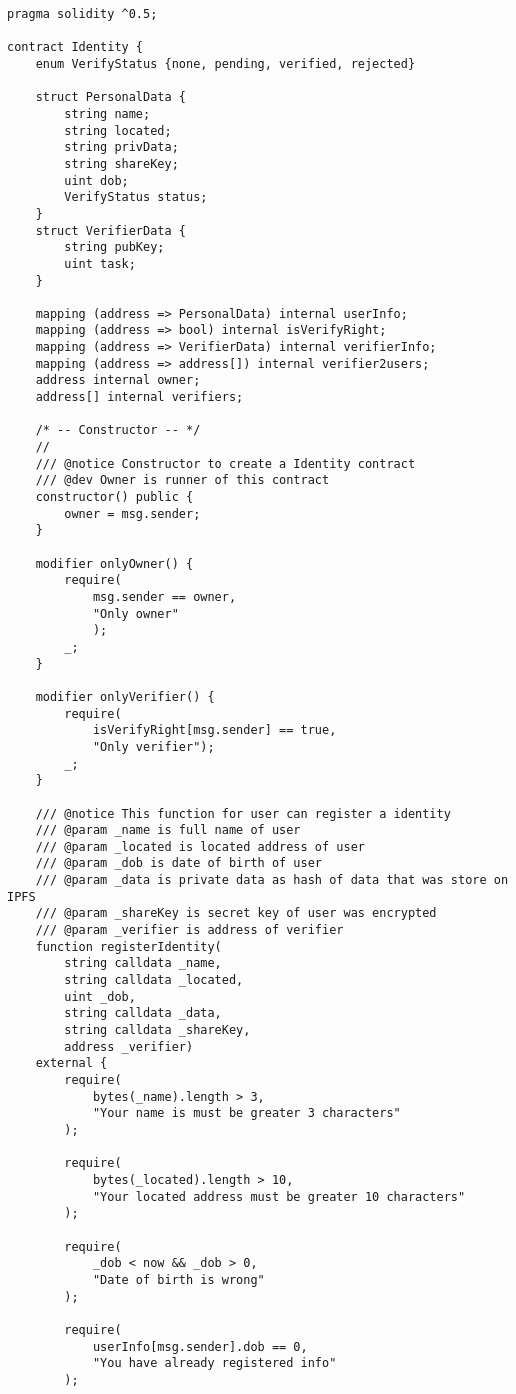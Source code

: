 \documentclass[../main-report.tex]{subfiles}
\begin{document}
\begin{lstlisting}
pragma solidity ^0.5;

contract Identity {
    enum VerifyStatus {none, pending, verified, rejected}

    struct PersonalData {
        string name;
        string located;
        string privData;
        string shareKey;
        uint dob;
        VerifyStatus status;
    }
    struct VerifierData {
        string pubKey;
        uint task;
    }

    mapping (address => PersonalData) internal userInfo;
    mapping (address => bool) internal isVerifyRight;
    mapping (address => VerifierData) internal verifierInfo;
    mapping (address => address[]) internal verifier2users;
    address internal owner;
    address[] internal verifiers;

    /* -- Constructor -- */
    //
    /// @notice Constructor to create a Identity contract
    /// @dev Owner is runner of this contract
    constructor() public {
        owner = msg.sender;
    }

    modifier onlyOwner() {
        require(
            msg.sender == owner,
            "Only owner"
            );
        _;
    }

    modifier onlyVerifier() {
        require(
            isVerifyRight[msg.sender] == true,
            "Only verifier");
        _;
    }

    /// @notice This function for user can register a identity
    /// @param _name is full name of user
    /// @param _located is located address of user
    /// @param _dob is date of birth of user
    /// @param _data is private data as hash of data that was store on IPFS
    /// @param _shareKey is secret key of user was encrypted
    /// @param _verifier is address of verifier
    function registerIdentity(
        string calldata _name,
        string calldata _located,
        uint _dob,
        string calldata _data,
        string calldata _shareKey,
        address _verifier)
    external {
        require(
            bytes(_name).length > 3,
            "Your name is must be greater 3 characters"
        );

        require(
            bytes(_located).length > 10,
            "Your located address must be greater 10 characters"
        );

        require(
            _dob < now && _dob > 0,
            "Date of birth is wrong"
        );

        require(
            userInfo[msg.sender].dob == 0,
            "You have already registered info"
        );


\end{lstlisting}
\end{document}
